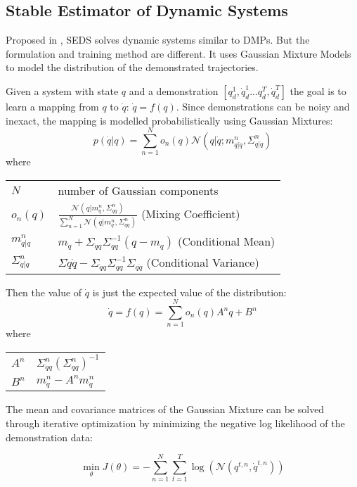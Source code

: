 \documentclass[conference]{IEEEtran}
\makeatletter
\newenvironment{conditions}
  {\par\vspace{\abovedisplayskip}\noindent\begin{tabular}{>{$}l<{$} @{${}={}$} l}}
  {\end{tabular}\par\vspace{\belowdisplayskip}}
\makeatother
\begin{document}
\subsection{Stable Estimator of Dynamic Systems}

Proposed in \cite{khansari-zadehLearningStableNonlinear2011}, SEDS solves dynamic systems similar to DMPs. But the formulation and training method are different. It uses Gaussian Mixture Models to model the distribution of the demonstrated trajectories.

Given a system with state $q$ and a demonstration \([q_d^1, \dot{q}_d^1...q_d^T, \dot{q}_d^T]\) the goal is to learn a mapping from $q$ to $\dot{q}$: $\dot{q} = f(q)$. Since demonstrations can be noisy and inexact, the mapping is modelled probabilistically using Gaussian Mixtures:
\begin{equation}
    p(\dot{q}|q) = \sum_{n=1}^N{o_n(q)\mathcal{N}(q|\dot{q};m^n_{q|\dot{q}}, \Sigma^n_{q|\dot{q}})}
\end{equation}
where
\begin{conditions}
    N & number of Gaussian components \\
    o_n(q) & \(\frac{\mathcal{N}(q|m^n_q,\Sigma^n_{qq})}{\sum_{n=1}^N{\mathcal{N}(q|m^n_q,\Sigma^n_{qq})}}\) (Mixing Coefficient)\\
    m^n_{\dot{q}|q} & $m_{\dot{q}} + \Sigma_{\dot{q}q}\Sigma_{qq}^{-1}(q - m_q)$ (Conditional Mean)\\
    \Sigma^n_{\dot{q}|q} & $\Sigma{\dot{q}\dot{q}} - \Sigma_{\dot{q}q}\Sigma_{qq}^{-1}\Sigma_{q\dot{q}}$ (Conditional Variance)\\
\end{conditions}
Then the value of $\dot{q}$ is just the expected value of the distribution:
\begin{equation}
    \dot{q} = f(q) = \sum_{n=1}^N{o_n(q)A^nq + B^n}
\end{equation}
where
\begin{conditions}
    A^n & $\Sigma^n_{\dot{q}q}(\Sigma^n_{qq})^{-1}$ \\
    B^n & $m^n_{\dot{q}} - A^nm^n_q$
\end{conditions}
The mean and covariance matrices of the Gaussian Mixture can be solved through iterative optimization by minimizing the negative log likelihood of the demonstration data:

\begin{equation}
    \min_{\theta}J(\theta) = -\sum_{n=1}^N\sum_{t=1}^T\log(\mathcal{N}(q^{t,n}, \dot{q}^{t,n}))
\end{equation}
\end{document}
